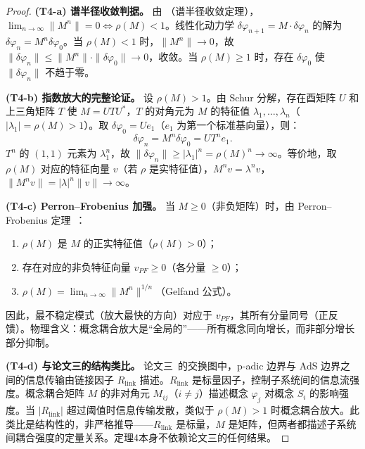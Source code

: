 \documentclass[12pt,a4paper]{article}
\theoremstyle{definition}
\begin{document}
\begin{proof}
\textbf{(T4-a) 谱半径收敛判据。}
由 （谱半径收敛定理），$\lim_{n\to\infty} \|M^n\| = 0 \iff \rho(M) < 1$。线性化动力学 $\delta\varphi_{n+1} = M \cdot \delta\varphi_n$ 的解为 $\delta\varphi_n = M^n \delta\varphi_0$。当 $\rho(M) < 1$ 时，$\|M^n\| \to 0$，故 $\|\delta\varphi_n\| \leq \|M^n\| \cdot \|\delta\varphi_0\| \to 0$，收敛。当 $\rho(M) \geq 1$ 时，存在 $\delta\varphi_0$ 使 $\|\delta\varphi_n\|$ 不趋于零。

\textbf{(T4-b) 指数放大的完整论证。}
设 $\rho(M) > 1$。由 Schur 分解，存在酉矩阵 $U$ 和上三角矩阵 $T$ 使 $M = U T U^*$，$T$ 的对角元为 $M$ 的特征值 $\lambda_1, \ldots, \lambda_n$（$|\lambda_1| = \rho(M) > 1$）。取 $\delta\varphi_0 = U e_1$（$e_1$ 为第一个标准基向量），则：
\begin{equation}
\delta\varphi_n = M^n \delta\varphi_0 = U T^n e_1.
\end{equation}
$T^n$ 的 $(1,1)$ 元素为 $\lambda_1^n$，故 $\|\delta\varphi_n\| \geq |\lambda_1|^n = \rho(M)^n \to \infty$。等价地，取 $\rho(M)$ 对应的特征向量 $v$（若 $\rho$ 是实特征值），$M^n v = \lambda^n v$，$\|M^n v\| = |\lambda|^n \|v\| \to \infty$。

\textbf{(T4-c) Perron--Frobenius 加强。}
当 $M \geq 0$（非负矩阵）时，由 Perron--Frobenius 定理~\cite{HornJohnson2013}：
\begin{enumerate}[leftmargin=*]
\item $\rho(M)$ 是 $M$ 的正实特征值（$\rho(M) > 0$）；
\item 存在对应的非负特征向量 $v_{PF} \geq 0$（各分量 $\geq 0$）；
\item $\rho(M) = \lim_{n\to\infty} \|M^n\|^{1/n}$（Gelfand 公式）。
\end{enumerate}
因此，最不稳定模式（放大最快的方向）对应于 $v_{PF}$，其所有分量同号（正反馈）。物理含义：概念耦合放大是“全局的”——所有概念同向增长，而非部分增长部分抑制。

\textbf{(T4-d) 与论文三的结构类比。}
论文三~\cite{PaperIII}的交换图中，p-adic 边界与 AdS 边界之间的信息传输由链接因子 $R_{\mathrm{link}}$ 描述。$R_{\mathrm{link}}$ 是标量因子，控制子系统间的信息流强度。概念耦合矩阵 $M$ 的非对角元 $M_{ij}$（$i \neq j$）描述概念 $\varphi_j$ 对概念 $S_i$ 的影响强度。当 $|R_{\mathrm{link}}|$ 超过阈值时信息传输发散，类似于 $\rho(M) > 1$ 时概念耦合放大。此类比是结构性的，非严格推导——$R_{\mathrm{link}}$ 是标量，$M$ 是矩阵，但两者都描述子系统间耦合强度的定量关系。定理4本身不依赖论文三的任何结果。
\end{proof}
\end{document}
